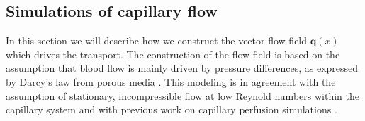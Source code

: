 \documentclass[journal,twocolumn]{IEEEtran}
\newcommand{\vq}{\mathbf{q}}
\begin{document}
	
	
	\subsection{Simulations of capillary flow}\label{sec:flow}
	In this section we will describe how we construct the vector flow field $\vq(x)$ which drives the transport.
	The construction of the flow field is based on the assumption that blood flow is mainly driven by pressure differences, as expressed by Darcy's law from porous media \cite{Darcy56}.
	This modeling is in agreement with the assumption of stationary, incompressible flow at low Reynold numbers within the capillary system \cite{Cho2011} and with previous work on capillary perfusion simulations \cite{Cookson2012,Michler2013}. 
	
\end{document}
